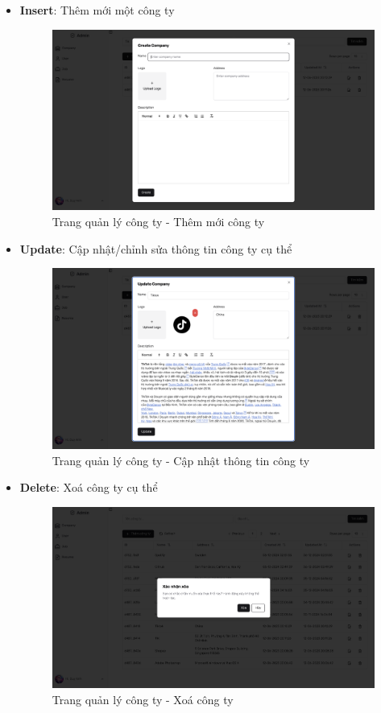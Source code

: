\begin{itemize}
    \item \textbf{Insert}: Thêm mới một công ty
    \begin{figure}[H]
        \centering
        \includegraphics[width=\linewidth]{DBMS-Application/Images/create-company.png}
        \caption{Trang quản lý công ty - Thêm mới công ty}
        \label{fig:enter-label}
    \end{figure}

    \item \textbf{Update}: Cập nhật/chỉnh sửa thông tin công ty cụ thể
    \begin{figure}[H]
        \centering
        \includegraphics[width=\linewidth]{DBMS-Application/Images/update-company.png}
        \caption{Trang quản lý công ty - Cập nhật thông tin công ty}
        \label{fig:enter-label}
    \end{figure}

    \item \textbf{Delete}: Xoá công ty cụ thể
    \begin{figure}[H]
        \centering
        \includegraphics[width=\linewidth]{DBMS-Application/Images/delete-company.png}
        \caption{Trang quản lý công ty - Xoá công ty}
        \label{fig:enter-label}
    \end{figure}
\end{itemize}